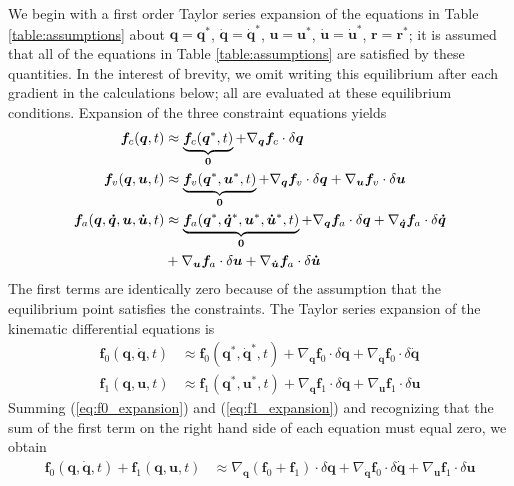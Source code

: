 \documentclass{svjour3}                     %
\begin{document}
We begin with a first order Taylor series expansion of the equations in Table
\ref{table:assumptions} about $\bm{q}=\bm{q}^*$, $\bm{\dot{q}}=\bm{\dot{q}}^*$,
$\bm{u}=\bm{u}^*$, $\bm{\dot{u}}=\bm{\dot{u}}^*$, $\bm{r}=\bm{r}^*$; it is
assumed that all of the equations in Table \ref{table:assumptions} are
satisfied by these quantities.  In the interest of brevity, we omit writing
this equilibrium after each gradient in the calculations below; all are
evaluated at these equilibrium conditions.  Expansion of the three constraint
equations yields
\begin{align}
  \label{eq:configuration_expansion}
  \bm{f}_{c}(\bm{q}, t) &\approx \underbrace{\bm{f}_{c}(\bm{q}^*, t)}_{\bm{0}} +
  \nabla_{\bm{q}}\bm{f}_{c} \cdot \delta \bm{q}\\
  \label{eq:velocity_expansion}
  \bm{f}_{v}(\bm{q}, \bm{u}, t) &\approx \underbrace{\bm{f}_{v}(\bm{q}^*,
  \bm{u}^*, t)}_{\bm{0}} +  \nabla_{\bm{q}}\bm{f}_{v} \cdot \delta \bm{q} +
  \nabla_{\bm{u}}\bm{f}_{v} \cdot \delta \bm{u} \\
  \label{eq:acceleration_expansion}
  \bm{f}_{a}(\bm{q}, \bm{\dot{q}}, \bm{u}, \bm{\dot{u}}, t) &\approx
  \underbrace{\bm{f}_{a}(\bm{q}^*, \bm{\dot{q}}^*, \bm{u}^*, \bm{\dot{u}}^*,
t)}_{\bm{0}} +  \nabla_{\bm{q}}\bm{f}_{a} \cdot \delta \bm{q} +
\nabla_{\bm{\dot{q}}}\bm{f}_{a}
\cdot \delta \bm{\dot{q}} \notag\\
&+ \nabla_{\bm{u}}\bm{f}_{a} \cdot \delta \bm{u} + \nabla_{\bm{\dot{u}}}\bm{f}_{a} \cdot
\delta \bm{\dot{u}}
\end{align}
The first terms are identically zero because of the assumption that the
equilibrium point satisfies the constraints.  The Taylor series expansion of
the kinematic differential equations is
\begin{align}
  \label{eq:f0_expansion}
  \bm{f}_{0}(\bm{q}, \bm{\dot{q}}, t) &\approx \bm{f}_{0}(\bm{q}^*,
  \bm{\dot{q}}^*, t) + \nabla_{\bm{q}}\bm{f}_{0} \cdot \delta\bm{q} +
  \nabla_{\bm{\dot{q}}}\bm{f}_{0} \cdot \delta\bm{\dot{q}}\\
  \label{eq:f1_expansion}
  \bm{f}_{1}(\bm{q}, \bm{u}, t) &\approx \bm{f}_{1}(\bm{q}^*,
  \bm{u}^*, t) + \nabla_{\bm{q}}\bm{f}_{1} \cdot \delta\bm{q} +
  \nabla_{\bm{u}}\bm{f}_{1} \cdot \delta\bm{u}
\end{align}
Summing (\ref{eq:f0_expansion}) and (\ref{eq:f1_expansion}) and recognizing
that the sum of the first term on the right hand side of each equation must
equal zero, we obtain
\begin{align}
  \label{eq:f0_plus_f1_expansion}
  \bm{f}_{0}(\bm{q}, \bm{\dot{q}}, t) + \bm{f}_{1}(\bm{q}, \bm{u}, t) &\approx
  \nabla_{\bm{q}}(\bm{f}_{0} + \bm{f}_{1}) \cdot \delta\bm{q} +
  \nabla_{\bm{\dot{q}}}\bm{f}_{0} \cdot \delta\bm{\dot{q}} +
  \nabla_{\bm{u}}\bm{f}_{1} \cdot \delta\bm{u}
\end{align}
\end{document}
